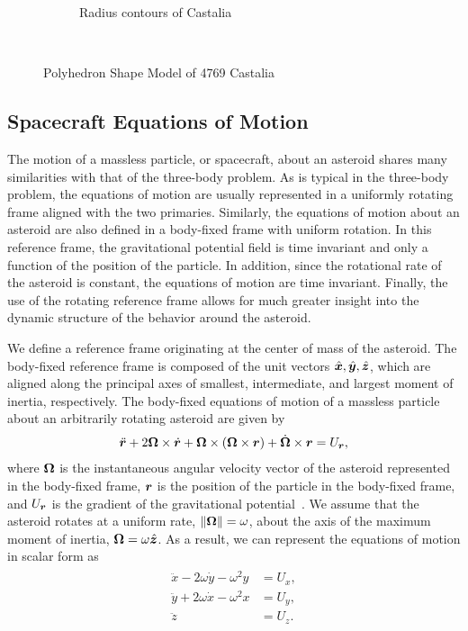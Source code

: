 \documentclass[]{aiaa-tc}%
\begin{document}
\begin{figure}
\begin{subfigure}[htbp]{0.45\textwidth}
        \caption{Radius contours of Castalia} \label{fig:radius_contour}
    \end{subfigure} ~ %
    \caption{Polyhedron Shape Model of 4769 Castalia}
    \label{fig:castalia}
\end{figure}

\subsection{Spacecraft Equations of Motion}\label{sec:sc_eoms}

The motion of a massless particle, or spacecraft, about an asteroid shares many similarities with that of the three-body problem.
As is typical in the three-body problem, the equations of motion are usually represented in a uniformly rotating frame aligned with the two primaries.
Similarly, the equations of motion about an asteroid are also defined in a body-fixed frame with uniform rotation.
In this reference frame, the gravitational potential field is time invariant and only a function of the position of the particle.
In addition, since the rotational rate of the asteroid is constant, the equations of motion are time invariant.
Finally, the use of the rotating reference frame allows for much greater insight into the dynamic structure of the behavior around the asteroid.

We define a reference frame originating at the center of mass of the asteroid.
The body-fixed reference frame is composed of the unit vectors \( \hat{\bm{x}} , \hat{\bm{y}}, \hat{\bm{z}} \), which are aligned along the principal axes of smallest, intermediate, and largest moment of inertia, respectively.
The body-fixed equations of motion of a massless particle about an arbitrarily rotating asteroid are given by
\begin{align}\label{eq:body_eoms}
    \ddot{\bm{r}} + 2 \bm{\Omega} \times \dot{\bm{r}} + \bm{\Omega} \times \left(  \bm{\Omega} \times \bm{r}  \right) + \dot{\bm{\Omega}} \times \bm{r} = U_{\bm{r}} ,
\end{align}
where \( \bm{\Omega} \) is the instantaneous angular velocity vector of the asteroid represented in the body-fixed frame, \( \bm{r} \) is the position of the particle in the body-fixed frame, and \( U_{\bm{r}} \) is the gradient of the gravitational potential~\cite{scheeres2012a}.
We assume that the asteroid rotates at a uniform rate, \( \left\| \bm{\Omega} \right\| = \omega \), about the axis of the maximum moment of inertia, \( \bm{\Omega} = \omega \hat{\bm{z} }\).
As a result, we can represent the equations of motion in scalar form as
\begin{align} \label{eq:eoms}
    \begin{split}
        \ddot{x} - 2 \omega \dot{y} - \omega^2 y &= U_x , \\
        \ddot{y} + 2 \omega \dot{x} - \omega^2 x &= U_y , \\
        \ddot{z} &= U_z .
    \end{split}
\end{align}
\end{document}
